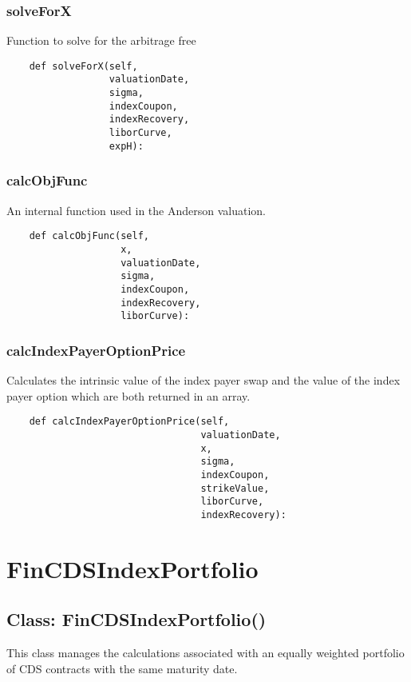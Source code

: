 \documentclass[twoside,11pt]{book}
\begin{document}
\subsubsection*{{\bf solveForX}}
Function to solve for the arbitrage free  

\begin{lstlisting}
    def solveForX(self,
                  valuationDate,
                  sigma,
                  indexCoupon,
                  indexRecovery,
                  liborCurve,
                  expH):
\end{lstlisting}

\subsubsection*{{\bf calcObjFunc}}
An internal function used in the Anderson valuation.  

\begin{lstlisting}
    def calcObjFunc(self,
                    x,
                    valuationDate,
                    sigma,
                    indexCoupon,
                    indexRecovery,
                    liborCurve):
\end{lstlisting}

\subsubsection*{{\bf calcIndexPayerOptionPrice}}
Calculates the intrinsic value of the index payer swap and the value of the index payer option which are both returned in an array.  

\begin{lstlisting}
    def calcIndexPayerOptionPrice(self,
                                  valuationDate,
                                  x,
                                  sigma,
                                  indexCoupon,
                                  strikeValue,
                                  liborCurve,
                                  indexRecovery):
\end{lstlisting}

\newpage
\section{FinCDSIndexPortfolio}

\subsection*{Class: FinCDSIndexPortfolio()}
This class manages the calculations associated with an equally weighted portfolio of CDS contracts with the same maturity date.  
\end{document}
